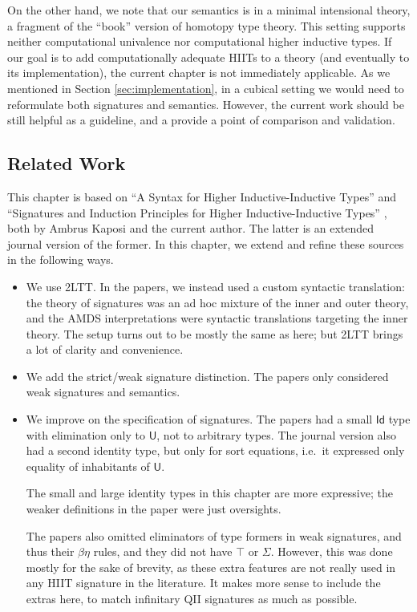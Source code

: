 \documentclass[12pt,a4paper,twoside,openany]{book}
\theoremstyle{remark}
\theoremstyle{definition}
\theoremstyle{theorem}
\newcommand{\U}{\mathsf{U}}
\newcommand{\Id}{\mathsf{Id}}
\begin{document}
On the other hand, we note that our semantics is in a minimal intensional
theory, a fragment of the ``book'' version of homotopy type theory. This setting
supports neither computational univalence nor computational higher inductive
types. If our goal is to add computationally adequate HIITs to a theory (and
eventually to its implementation), the current chapter is not immediately
applicable. As we mentioned in Section \ref{sec:implementation}, in a cubical
setting we would need to reformulate both signatures and semantics. However, the
current work should be still helpful as a guideline, and a provide a point of
comparison and validation.


\subsection{Related Work}
\label{sec:hii-related-work}

This chapter is based on ``A Syntax for Higher Inductive-Inductive Types''
\cite{hiit} and ``Signatures and Induction Principles for Higher
Inductive-Inductive Types'' \cite{hiits}, both by Ambrus Kaposi and the current
author. The latter is an extended journal version of the former. In this
chapter, we extend and refine these sources in the following ways.
\begin{itemize}
\item
    We use 2LTT. In the papers, we instead used a custom syntactic translation:
    the theory of signatures was an ad hoc mixture of the inner and outer
    theory, and the AMDS interpretations were syntactic translations targeting
    the inner theory. The setup turns out to be mostly the same as here; but
    2LTT brings a lot of clarity and convenience.
\item
    We add the strict/weak signature distinction. The papers only considered
    weak signatures and semantics.
\item
    We improve on the specification of signatures. The papers had a small $\Id$
    type with elimination only to $\U$, not to arbitrary types. The journal
    version also had a second identity type, but only for sort equations,
    i.e.\ it expressed only equality of inhabitants of $\U$.

    The small and large identity types in this chapter are more expressive; the
    weaker definitions in the paper were just oversights.

    The papers also omitted eliminators of type formers in weak signatures, and
    thus their $\beta\eta$ rules, and they did not have $\top$ or
    $\Sigma$. However, this was done mostly for the sake of brevity, as these
    extra features are not really used in any HIIT signature in the literature.
    It makes more sense to include the extras here, to match infinitary QII
    signatures as much as possible.
\end{itemize}
\end{document}
